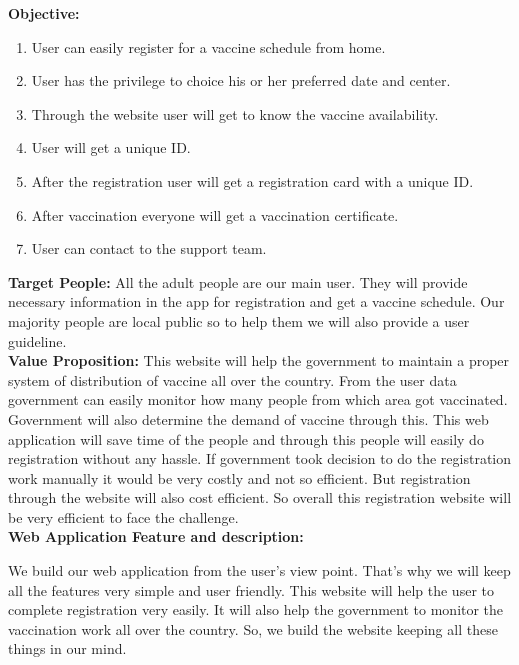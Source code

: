 \documentclass[
]{article}
\begin{document}
\textbf{Objective:}

\begin{enumerate}
\def\labelenumi{\arabic{enumi}.}
\item
  User can easily register for a vaccine schedule from home.
\item
  User has the privilege to choice his or her preferred date and center.
\item
  Through the website user will get to know the vaccine availability.
\item
  User will get a unique ID.
\item
  After the registration user will get a registration card with a unique
  ID.
\item
  After vaccination everyone will get a vaccination certificate.
\item
  User can contact to the support team.\\[2mm]
\end{enumerate}

\textbf{Target People:} All the adult people are our main user. They
will provide necessary information in the app for registration and get a
vaccine schedule. Our majority people are local public so to help them
we will also provide a user guideline.\\[2mm]

\textbf{Value Proposition:} This website will help the government to
maintain a proper system of distribution of vaccine all over the
country. From the user data government can easily monitor how many
people from which area got vaccinated. Government will also determine
the demand of vaccine through this. This web application will save time
of the people and through this people will easily do registration
without any hassle. If government took decision to do the registration
work manually it would be very costly and not so efficient. But
registration through the website will also cost efficient. So overall
this registration website will be very efficient to face the challenge.\\[7mm]

\textbf{Web Application Feature and description:}

We build our web application from the user's view point. That's why we
will keep all the features very simple and user friendly. This website
will help the user to complete registration very easily. It will also
help the government to monitor the vaccination work all over the
country. So, we build the website keeping all these things in our mind.
\end{document}
